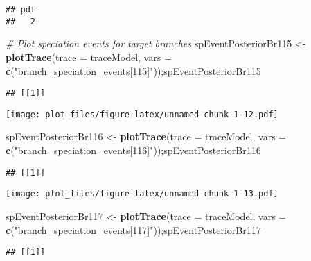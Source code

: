 \documentclass[
]{article}
\newenvironment{Shaded}{\begin{snugshade}}{\end{snugshade}}
\newcommand{\AttributeTok}[1]{\textcolor[rgb]{0.13,0.29,0.53}{#1}}
\newcommand{\CommentTok}[1]{\textcolor[rgb]{0.56,0.35,0.01}{\textit{#1}}}
\newcommand{\FunctionTok}[1]{\textcolor[rgb]{0.13,0.29,0.53}{\textbf{#1}}}
\newcommand{\NormalTok}[1]{#1}
\newcommand{\OtherTok}[1]{\textcolor[rgb]{0.56,0.35,0.01}{#1}}
\newcommand{\StringTok}[1]{\textcolor[rgb]{0.31,0.60,0.02}{#1}}
\begin{document}
\begin{verbatim}
## pdf 
##   2
\end{verbatim}

\begin{Shaded}
\begin{Highlighting}[]
\CommentTok{\# Plot speciation events for target branches}
\NormalTok{spEventPosteriorBr115 }\OtherTok{\textless{}{-}} \FunctionTok{plotTrace}\NormalTok{(}\AttributeTok{trace =}\NormalTok{ traceModel, }
                              \AttributeTok{vars =} \FunctionTok{c}\NormalTok{(}\StringTok{"branch\_speciation\_events[115]"}\NormalTok{));spEventPosteriorBr115}
\end{Highlighting}
\end{Shaded}

\begin{verbatim}
## [[1]]
\end{verbatim}

\texttt{[image: plot\_files/figure-latex/unnamed-chunk-1-12.pdf]}

\begin{Shaded}
\begin{Highlighting}[]
\NormalTok{spEventPosteriorBr116 }\OtherTok{\textless{}{-}} \FunctionTok{plotTrace}\NormalTok{(}\AttributeTok{trace =}\NormalTok{ traceModel, }
                              \AttributeTok{vars =} \FunctionTok{c}\NormalTok{(}\StringTok{"branch\_speciation\_events[116]"}\NormalTok{));spEventPosteriorBr116}
\end{Highlighting}
\end{Shaded}

\begin{verbatim}
## [[1]]
\end{verbatim}

\texttt{[image: plot\_files/figure-latex/unnamed-chunk-1-13.pdf]}

\begin{Shaded}
\begin{Highlighting}[]
\NormalTok{spEventPosteriorBr117 }\OtherTok{\textless{}{-}} \FunctionTok{plotTrace}\NormalTok{(}\AttributeTok{trace =}\NormalTok{ traceModel, }
                              \AttributeTok{vars =} \FunctionTok{c}\NormalTok{(}\StringTok{"branch\_speciation\_events[117]"}\NormalTok{));spEventPosteriorBr117}
\end{Highlighting}
\end{Shaded}

\begin{verbatim}
## [[1]]
\end{verbatim}
\end{document}
